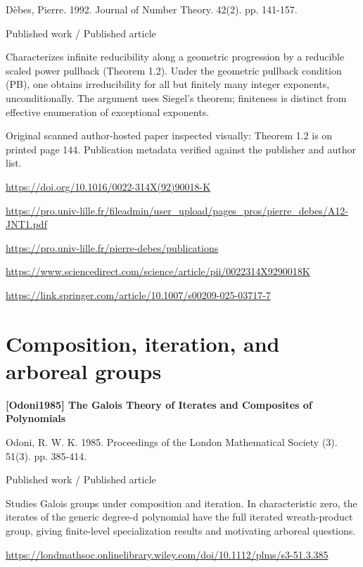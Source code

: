 \documentclass[11pt,a4paper,oneside,openany]{book}
\begin{document}
\color{black} Dèbes, Pierre. 1992. Journal of Number Theory. 42(2). pp. 141-157.\par
{\small\sffamily\color{atlasgold}Published work / Published article}\par
\color{black} Characterizes infinite reducibility along a geometric progression by a reducible scaled power pullback (Theorem 1.2). Under the geometric pullback condition (PB), one obtains irreducibility for all but finitely many integer exponents, unconditionally. The argument uses Siegel's theorem; finiteness is distinct from effective enumeration of exceptional exponents.\par
{\small Original scanned author-hosted paper inspected visually: Theorem 1.2 is on printed page 144. Publication metadata verified against the publisher and author list.}\par
{\footnotesize\url{https://doi.org/10.1016/0022-314X(92)90018-K}}\par
{\footnotesize\url{https://pro.univ-lille.fr/fileadmin/user_upload/pages_pros/pierre_debes/A12-JNT1.pdf}}\par
{\footnotesize\url{https://pro.univ-lille.fr/pierre-debes/publications}}\par
{\footnotesize\url{https://www.sciencedirect.com/science/article/pii/0022314X9290018K}}\par
{\footnotesize\url{https://link.springer.com/article/10.1007/s00209-025-03717-7}}\par
\vspace{9pt}
\section{Composition, iteration, and arboreal groups}
\hypertarget{ref:Odoni1985}{}
{\sffamily\bfseries\color{atlasgreen}[Odoni1985] The Galois Theory of Iterates and Composites of Polynomials}\par
\color{black} Odoni, R. W. K. 1985. Proceedings of the London Mathematical Society (3). 51(3). pp. 385-414.\par
{\small\sffamily\color{atlasgold}Published work / Published article}\par
\color{black} Studies Galois groups under composition and iteration. In characteristic zero, the iterates of the generic degree-d polynomial have the full iterated wreath-product group, giving finite-level specialization results and motivating arboreal questions.\par
{\footnotesize\url{https://londmathsoc.onlinelibrary.wiley.com/doi/10.1112/plms/s3-51.3.385}}\par
\end{document}
